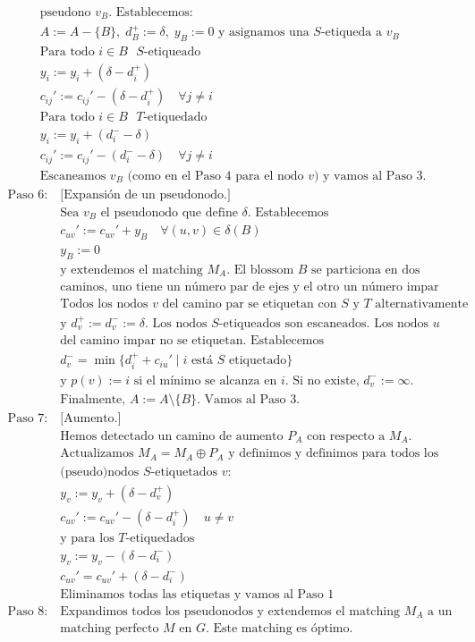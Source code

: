 \documentclass[twoside,a4paper,openright,12pt,tikz]{book}
\begin{document}
\begin{align*}
&\text{pseudono $v_B$. Establecemos:}\\
&A:=A-\{B\},\;d^+_B:=\delta,\;y_B:=0 \text{ y asignamos una $S$-etiqueda a $v_B$}\\
&\text{Para todo $i \in B$ $S$-etiqueado}\\
&y_i:=y_i + (\delta-d_i^+)\\
&c_{ij}' := c_{ij}' -(\delta-d_i^+) \quad \forall j\neq i\\
&\text{Para todo $i \in B$ $T$-etiquedado}\\
&y_i:=y_i + (d^-_i-\delta)\\
&c_{ij}' := c_{ij}' -(d_i^- -\delta) \quad \forall j\neq i\\
&\text{Escaneamos $v_B$ (como en el Paso 4 para el nodo $v$) y vamos al Paso 3.}
\end{align*}
\begin{align*}
\text{Paso 6: }&\text{[Expansión de un pseudonodo.]}\\
&\text{Sea $v_B$ el pseudonodo que define $\delta$. Establecemos}\\
&c_{uv}':=c_{uv}'+y_B\quad \forall (u,v)\in\delta(B)\\
&y_B:=0\\
&\text{y extendemos el matching $M_A$. El blossom $B$ se particiona en dos}\\
&\text{caminos, uno tiene un número par de ejes y el otro un número impar}\\
&\text{Todos los nodos $v$ del camino par se etiquetan con $S$ y $T$ alternativamente}\\
&\text{y $d_v^+:=d_v^-:=\delta$. Los nodos $S$-etiqueados son escaneados. Los nodos $u$}\\
&\text{del camino impar no se etiquetan. Establecemos}\\
&d^-_v=\min\{d_i^++c_{iu}'\mid i\text{ está $S$ etiquetado}\}\\
&\text{y $p(v):=i$ si el mínimo se alcanza en $i$. Si no existe, $d_v^-:=\infty$.}\\
&\text{Finalmente, $A:=A\setminus\{B\}$. Vamos al Paso 3.}\\
\text{Paso 7: }&\text{[Aumento.]}\\
&\text{Hemos detectado un camino de aumento $P_A$ con respecto a $M_A$.}\\
&\text{Actualizamos $M_A = M_A \oplus P_A$ y definimos y definimos para todos los}\\
&\text{(pseudo)nodos $S$-etiquetados $v$:}\\
&y_v:=y_v+(\delta-d_v^+)\\
&c_{uv}' := c_{uv}' - (\delta-d_i^+) \quad u\neq v\\
&\text{y para los $T$-etiquedados}\\
&y_v:=y_v-(\delta-d_i^-)\\
&c_{uv}'=c_{uv}'+(\delta-d_i^-)\\
&\text{Eliminamos todas las etiquetas y vamos al Paso 1}\\
\text{Paso 8: }& \text{Expandimos todos los pseudonodos y extendemos el matching $M_A$ a un}\\
&\text{matching perfecto $M$ en $G$. Este matching es óptimo.} 
\end{align*}
\newpage
\end{document}

